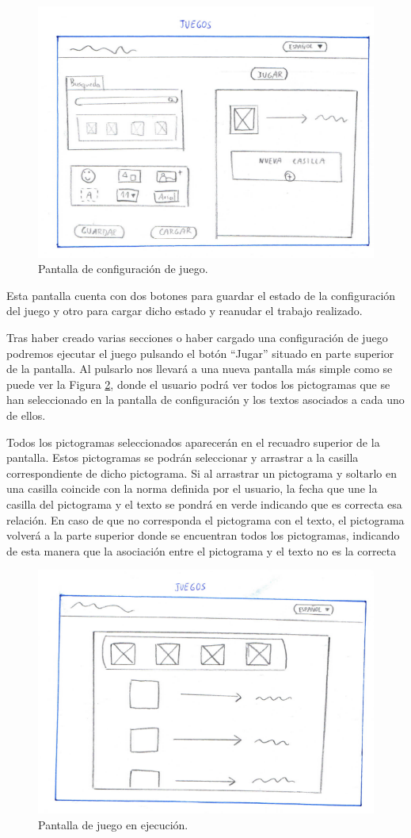 	\begin{figure}[h!]
		\centering
		\includegraphics[width=0.7\linewidth]{Imagenes/Bitmap/juegosJorge}
		\caption{Pantalla de configuración de juego.}
		\label{fig:juegosjorge}
	\end{figure}

	Esta pantalla cuenta con dos botones para guardar el estado de la configuración del juego y otro para cargar dicho estado y reanudar el trabajo realizado.
	
	Tras haber creado varias secciones o haber cargado una configuración de juego podremos ejecutar el juego pulsando el botón “Jugar” situado en parte superior de la pantalla. Al pulsarlo nos llevará a una nueva pantalla más simple como se puede ver la Figura \ref{fig:juegojorge}, donde el usuario podrá ver todos los pictogramas que se han seleccionado en la pantalla de configuración y los textos asociados a cada uno de ellos.
	
	Todos los pictogramas seleccionados aparecerán en el recuadro superior de la pantalla. Estos pictogramas se podrán seleccionar y arrastrar a la casilla correspondiente de dicho pictograma. Si al arrastrar un pictograma y soltarlo en una casilla coincide con la norma definida por el usuario, la fecha que une la casilla del pictograma y el texto se pondrá en verde indicando que es correcta esa relación. En caso de que no corresponda el pictograma con el texto, el pictograma volverá a la parte superior donde se encuentran todos los pictogramas, indicando de esta manera que la asociación entre el pictograma y el texto no es la correcta
	 
	

	\begin{figure}[h!]
	\centering
	\includegraphics[width=0.7\linewidth]{Imagenes/Bitmap/juegoJorge}
	\caption{Pantalla de juego en ejecución.}
	\label{fig:juegojorge}
	\end{figure}
	

